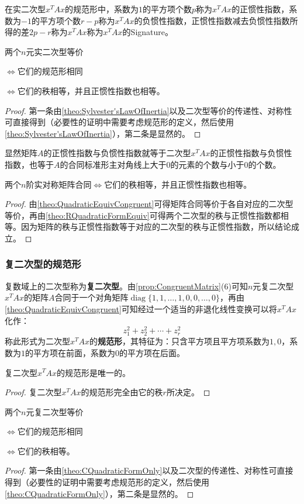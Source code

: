 \begin{definition}
	在实二次型$x^TAx$的规范形中，系数为$1$的平方项个数$p$称为$x^TAx$的正惯性指数，系数为$-1$的平方项个数$r-p$称为$x^TAx$的负惯性指数，正惯性指数减去负惯性指数所得的差$2p-r$称为$x^TAx$称为$x^TAx$的\gls{Signature}。
\end{definition}
\begin{theorem}\label{theo:RQuadraticFormEquiv}
	两个$n$元实二次型等价\par
	$\iff$它们的规范形相同\par
	$\iff$它们的秩相等，并且正惯性指数也相等。
\end{theorem}
\begin{proof}
	第一条由\cref{theo:Sylvester'sLawOfInertia}以及二次型等价的传递性、对称性可直接得到（必要性的证明中需要考虑规范形的定义，然后使用\cref{theo:Sylvester'sLawOfInertia}），第二条是显然的。
\end{proof}
显然矩阵$A$的正惯性指数与负惯性指数就等于二次型$x^TAx$的正惯性指数与负惯性指数，也等于$A$的合同标准形主对角线上大于$0$的元素的个数与小于$0$的个数。
\begin{theorem}
	两个$n$阶实对称矩阵合同$\iff$它们的秩相等，并且正惯性指数也相等。
\end{theorem}
\begin{proof}
	由\cref{theo:QuadraticEquivCongruent}可得矩阵合同等价于各自对应的二次型等价，再由\cref{theo:RQuadraticFormEquiv}可得两个二次型的秩与正惯性指数都相等。因为矩阵的秩与正惯性指数等于对应的二次型的秩与正惯性指数，所以结论成立。
\end{proof}
\subsubsection{复二次型的规范形}
\begin{definition}
	复数域上的二次型称为\textbf{复二次型}。由\cref{prop:CongruentMatrix}(6)可知$n$元复二次型$x^TAx$的矩阵$A$合同于一个对角矩阵$\operatorname{diag}\{1,1,\dots,1,0,0,\dots,0\}$，再由\cref{theo:QuadraticEquivCongruent}可知经过一个适当的非退化线性变换可以将$x^TAx$化作：
	\begin{equation*}
		z_1^2+z_2^2+\cdots+z_r^2
	\end{equation*}
	称此形式为二次型$x^TAx$的\textbf{规范形}，其特征为：只含平方项且平方项系数为$1,0$，系数为$1$的平方项在前面，系数为$0$的平方项在后面。
\end{definition}
\begin{theorem}\label{theo:CQuadraticFormOnly}
	复二次型$x^TAx$的规范形是唯一的。
\end{theorem}
\begin{proof}
	复二次型$x^TAx$的规范形完全由它的秩$r$所决定。
\end{proof}
\begin{theorem}
	两个$n$元复二次型等价\par
	$\iff$它们的规范形相同\par
	$\iff$它们的秩相等。
\end{theorem}
\begin{proof}
	第一条由\cref{theo:CQuadraticFormOnly}以及二次型的传递性、对称性可直接得到（必要性的证明中需要考虑规范形的定义，然后使用\cref{theo:CQuadraticFormOnly}），第二条是显然的。
\end{proof}

